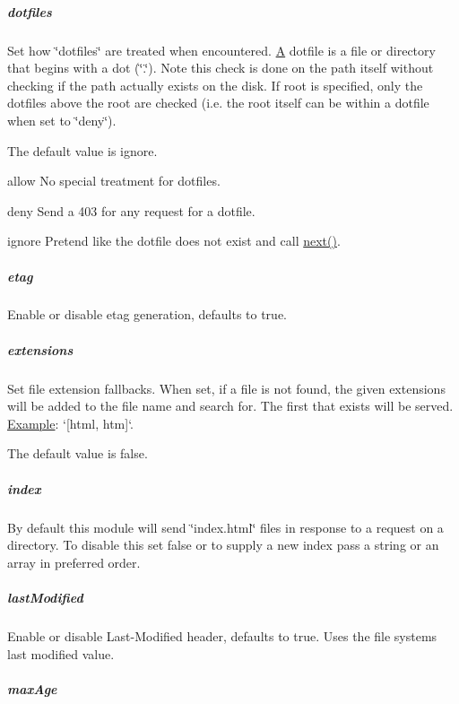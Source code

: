 \subparagraph*{dotfiles}

Set how \char`\"{}dotfiles\char`\"{} are treated when encountered. \hyperlink{class_a}{A} dotfile is a file or directory that begins with a dot (\char`\"{}.\char`\"{}). Note this check is done on the path itself without checking if the path actually exists on the disk. If {\ttfamily root} is specified, only the dotfiles above the root are checked (i.\+e. the root itself can be within a dotfile when set to \char`\"{}deny\char`\"{}).

The default value is {\ttfamily \textquotesingle{}ignore\textquotesingle{}}.


\begin{DoxyItemize}
\item {\ttfamily \textquotesingle{}allow\textquotesingle{}} No special treatment for dotfiles.
\item {\ttfamily \textquotesingle{}deny\textquotesingle{}} Send a 403 for any request for a dotfile.
\item {\ttfamily \textquotesingle{}ignore\textquotesingle{}} Pretend like the dotfile does not exist and call {\ttfamily \hyperlink{057__caller__graphs_8tcl_a3f808a00e1b937978455d707851ab33a}{next()}}.
\end{DoxyItemize}

\subparagraph*{etag}

Enable or disable etag generation, defaults to true.

\subparagraph*{extensions}

Set file extension fallbacks. When set, if a file is not found, the given extensions will be added to the file name and search for. The first that exists will be served. \hyperlink{struct_example}{Example}\+: `\mbox{[}\textquotesingle{}html\textquotesingle{}, \textquotesingle{}htm\textquotesingle{}\mbox{]}`.

The default value is {\ttfamily false}.

\subparagraph*{index}

By default this module will send \char`\"{}index.\+html\char`\"{} files in response to a request on a directory. To disable this set {\ttfamily false} or to supply a new index pass a string or an array in preferred order.

\subparagraph*{last\+Modified}

Enable or disable {\ttfamily Last-\/\+Modified} header, defaults to true. Uses the file system\textquotesingle{}s last modified value.

\subparagraph*{max\+Age}

